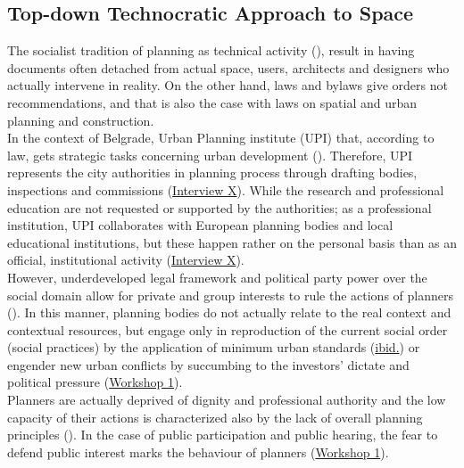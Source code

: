 \documentclass[11pt]{report}
\begin{document}
\subsection{Top-down Technocratic Approach to Space}

The socialist tradition of planning as technical activity (\citealt{vujosevic_planning_2006}), result in having documents often detached from actual space, users, architects and designers who actually intervene in reality.
On the other hand, laws and bylaws give orders not recommendations, and 
that is also the case with laws on spatial and urban planning and construction.
\\

In the context of Belgrade, Urban Planning institute (UPI) that, according to law, gets strategic tasks concerning urban development (\cite{PCA}).
Therefore, UPI represents the city authorities in planning process through drafting bodies, inspections and commissions (\href{InterviewX}{Interview X}).
While the research and professional education are not requested or supported by the authorities; as a professional institution, UPI collaborates with European planning bodies and local educational institutions, but these happen rather on the personal basis than as an official, institutional activity
(\href{InterviewX}{Interview X}).
\\

However, underdeveloped legal framework and political party power over the social domain allow for private and group interests to rule the actions of planners (\cite{VujovicAndPetrovic2007}).
In this manner, planning bodies do not actually relate to the real context and contextual resources, but engage only in reproduction of the current social order (social practices) by the application of minimum urban standards (\href{Vujovic}{ibid.}) or engender new urban conflicts by succumbing to the investors' dictate and political pressure
(\href{Expert Workshop}{Workshop 1}).
\\

Planners are  actually deprived of dignity and professional authority and the low capacity of their actions is characterized also by the lack of overall planning principles (\citealt{petrovic_cities_2009}).
In the case of public participation and public hearing, the fear to defend public interest marks the behaviour of planners (\href{Expert Workshop}{Workshop 1}).
\\
\end{document}
